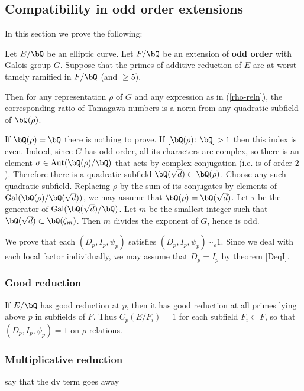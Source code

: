 \subsection{Compatibility in odd order extensions}

In this section we prove the following:

\begin{thm}
    Let $E / \bQ$ be an elliptic curve. Let $F / \bQ$ be an extension of \textbf{odd order} with Galois group $G$. Suppose that the primes of additive reduction of $E$ are at worst tamely ramified in $F / \bQ$ (and $\geq 5$). 
    
    Then for any representation $\rho$ of $G$ and any expression as in (\ref{rho-reln}), the corresponding ratio of Tamagawa numbers is a norm from any quadratic subfield of $\bQ(\rho)$.
\end{thm}

If $\bQ(\rho) = \bQ$ there is nothing to prove. 
If $[\bQ(\rho) \colon \bQ] > 1$ then this index is even. Indeed, since $G$ has odd order, all its characters are complex, so there is an element $\sigma \in \Aut(\bQ(\rho) / \bQ)$ that acts by complex conjugation (i.e. is of order $2$). Therefore there is a quadratic subfield $\bQ(\sqrt{d}) \subset \bQ(\rho)$. Choose any such quadratic subfield. Replacing $\rho$ by the sum of its conjugates by elements of $ \Gal(\bQ(\rho) / \bQ(\sqrt{d}))$, we may assume that $\bQ(\rho) = \bQ(\sqrt{d})$. Let $\tau$ be the generator of $\Gal(\bQ(\sqrt{d}) / \bQ)$. Let $m$ be the smallest integer such that $\bQ(\sqrt{d}) \subset \bQ(\zeta_m)$. Then $m$ divides the exponent of $G$, hence is odd.

We prove that each $(D_p, I_p, \psi_p)$  satisfies $(D_p, I_p, \psi_p) \sim_{\rho} 1$. Since we deal with each local factor individually, we may assume that $D_p = I_p$ by theorem \ref{DeqI}. 

\subsubsection*{Good reduction}
If $E / \bQ$ has good reduction at $p$, then it has good reduction at all primes lying above $p$ in subfields of $F$. Thus $C_p(E / F_i) = 1$ for each subfield $F_i \subset F$, so that $(D_p, I_p, \psi_p) = 1$ on $\rho$-relations. 

\subsubsection*{Multiplicative reduction}
{\color{red} say that the dv term goes away}


